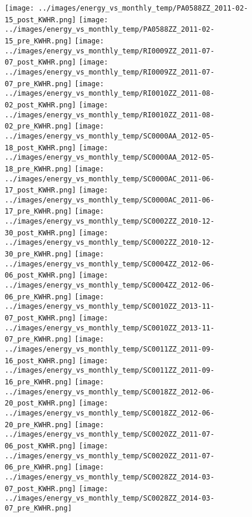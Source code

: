 \clearpage
\begin{figure}
\centering
\texttt{[image: ../images/energy\_vs\_monthly\_temp/PA0588ZZ\_2011-02-15\_post\_KWHR.png]}
\texttt{[image: ../images/energy\_vs\_monthly\_temp/PA0588ZZ\_2011-02-15\_pre\_KWHR.png]}
\texttt{[image: ../images/energy\_vs\_monthly\_temp/RI0009ZZ\_2011-07-07\_post\_KWHR.png]}
\texttt{[image: ../images/energy\_vs\_monthly\_temp/RI0009ZZ\_2011-07-07\_pre\_KWHR.png]}
\texttt{[image: ../images/energy\_vs\_monthly\_temp/RI0010ZZ\_2011-08-02\_post\_KWHR.png]}
\texttt{[image: ../images/energy\_vs\_monthly\_temp/RI0010ZZ\_2011-08-02\_pre\_KWHR.png]}
\texttt{[image: ../images/energy\_vs\_monthly\_temp/SC0000AA\_2012-05-18\_post\_KWHR.png]}
\texttt{[image: ../images/energy\_vs\_monthly\_temp/SC0000AA\_2012-05-18\_pre\_KWHR.png]}
\texttt{[image: ../images/energy\_vs\_monthly\_temp/SC0000AC\_2011-06-17\_post\_KWHR.png]}
\texttt{[image: ../images/energy\_vs\_monthly\_temp/SC0000AC\_2011-06-17\_pre\_KWHR.png]}
\texttt{[image: ../images/energy\_vs\_monthly\_temp/SC0002ZZ\_2010-12-30\_post\_KWHR.png]}
\texttt{[image: ../images/energy\_vs\_monthly\_temp/SC0002ZZ\_2010-12-30\_pre\_KWHR.png]}
\texttt{[image: ../images/energy\_vs\_monthly\_temp/SC0004ZZ\_2012-06-06\_post\_KWHR.png]}
\texttt{[image: ../images/energy\_vs\_monthly\_temp/SC0004ZZ\_2012-06-06\_pre\_KWHR.png]}
\texttt{[image: ../images/energy\_vs\_monthly\_temp/SC0010ZZ\_2013-11-07\_post\_KWHR.png]}
\texttt{[image: ../images/energy\_vs\_monthly\_temp/SC0010ZZ\_2013-11-07\_pre\_KWHR.png]}
\texttt{[image: ../images/energy\_vs\_monthly\_temp/SC0011ZZ\_2011-09-16\_post\_KWHR.png]}
\texttt{[image: ../images/energy\_vs\_monthly\_temp/SC0011ZZ\_2011-09-16\_pre\_KWHR.png]}
\texttt{[image: ../images/energy\_vs\_monthly\_temp/SC0018ZZ\_2012-06-20\_post\_KWHR.png]}
\texttt{[image: ../images/energy\_vs\_monthly\_temp/SC0018ZZ\_2012-06-20\_pre\_KWHR.png]}
\texttt{[image: ../images/energy\_vs\_monthly\_temp/SC0020ZZ\_2011-07-06\_post\_KWHR.png]}
\texttt{[image: ../images/energy\_vs\_monthly\_temp/SC0020ZZ\_2011-07-06\_pre\_KWHR.png]}
\texttt{[image: ../images/energy\_vs\_monthly\_temp/SC0028ZZ\_2014-03-07\_post\_KWHR.png]}
\texttt{[image: ../images/energy\_vs\_monthly\_temp/SC0028ZZ\_2014-03-07\_pre\_KWHR.png]}
\end{figure}
